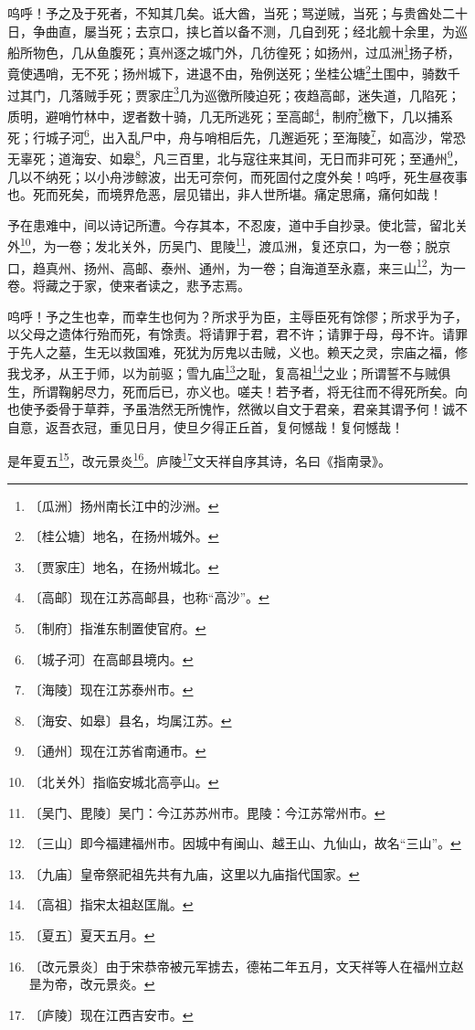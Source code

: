 \documentclass[12pt,UTF-8,openany,a4]{ctexbook}
\begin{document}
\begin{large}
    呜呼！予之及于死者，不知其几矣。诋大酋，当死；骂逆贼，当死；与贵酋处二十日，争曲直，屡当死；去京口，挟匕首以备不测，几自刭死；经北舰十余里，为巡船所物色，几从鱼腹死；真州逐之城门外，几彷徨死；如扬州，过瓜洲\footnote{〔瓜洲〕\yiwen 扬州南长江中的沙洲。}扬子桥，竟使遇哨，无不死；扬州城下，进退不由，殆例送死；坐桂公塘\footnote{〔桂公塘〕\yiwen 地名，在扬州城外。}土围中，骑数千过其门，几落贼手死；贾家庄\footnote{〔贾家庄〕\yiwen 地名，在扬州城北。}几为巡徼所陵迫死；夜趋高邮，迷失道，几陷死；质明，避哨竹林中，逻者数十骑，几无所逃死；至高邮\footnote{〔高邮〕\yiwen 现在江苏高邮县，也称“高沙”。}，制府\footnote{〔制府〕\yiwen 指淮东制置使官府。}檄下，几以捕系死；行城子河\footnote{〔城子河〕\yiwen 在高邮县境内。}，出入乱尸中，舟与哨相后先，几邂逅死；至海陵\footnote{〔海陵〕\yiwen 现在江苏泰州市。}，如高沙，常恐无辜死；道海安、如皋\footnote{〔海安、如皋〕\yiwen 县名，均属江苏。}，凡三百里，北与寇往来其间，无日而非可死；至通州\footnote{〔通州〕\yiwen 现在江苏省南通市。}，几以不纳死；以小舟涉鲸波，出无可奈何，而死固付之度外矣！呜呼，死生昼夜事也。死而死矣，而境界危恶，层见错出，非人世所堪。痛定思痛，痛何如哉！
    
    予在患难中，间以诗记所遭。今存其本，不忍废，道中手自抄录。使北营，留北关外\footnote{〔北关外〕\yiwen 指临安城北高亭山。}，为一卷；发北关外，历吴门、毘陵\footnote{〔吴门、毘陵〕\yiwen 吴门：今江苏苏州市。毘陵：今江苏常州市。}，渡瓜洲，复还京口，为一卷；脱京口，趋真州、扬州、高邮、泰州、通州，为一卷；自海道至永嘉，来三山\footnote{〔三山〕\yiwen 即今福建福州市。因城中有闽山、越王山、九仙山，故名“三山”。}，为一卷。将藏之于家，使来者读之，悲予志焉。
    
    呜呼！予之生也幸，而幸生也何为？所求乎为臣，主辱臣死有馀僇；所求乎为子，以父母之遗体行殆而死，有馀责。将请罪于君，君不许；请罪于母，母不许。请罪于先人之墓，生无以救国难，死犹为厉鬼以击贼，义也。赖天之灵，宗庙之福，修我戈矛，从王于师，以为前驱；雪九庙\footnote{〔九庙〕\yiwen 皇帝祭祀祖先共有九庙，这里以九庙指代国家。}之耻，复高祖\footnote{〔高祖〕\yiwen 指宋太祖赵匡胤。}之业；所谓誓不与贼俱生，所谓鞠躬尽力，死而后已，亦义也。嗟夫！若予者，将无往而不得死所矣。向也使予委骨于草莽，予虽浩然无所愧怍，然微以自文于君亲，君亲其谓予何！诚不自意，返吾衣冠，重见日月，使旦夕得正丘首，复何憾哉！复何憾哉！
    
    是年夏五\footnote{〔夏五〕\yiwen 夏天五月。}，改元景炎\footnote{〔改元景炎〕\yiwen 由于宋恭帝被元军掳去，德祐二年五月，文天祥等人在福州立赵昰为帝，改元景炎。}。庐陵\footnote{〔庐陵〕\yiwen 现在江西吉安市。}文天祥自序其诗，名曰《指南录》。
\end{large}
\end{document}
